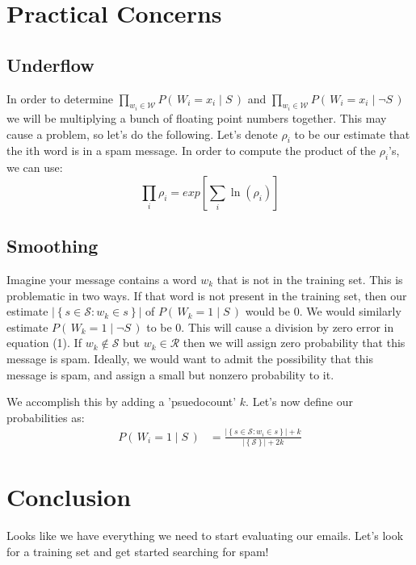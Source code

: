 \documentclass[11pt, oneside]{article}   	%
\begin{document}
\section*{Practical Concerns}
\subsection*{Underflow} In order to determine $\prod_{w_i \in \mathcal{W}} P(\,W_i=x_i \mid S\,)$ and $\prod_{w_i \in \mathcal{W}} P(\,W_i=x_i \mid \neg S\,)$ we will be multiplying a bunch of floating point numbers together. This may cause a problem, so let's do the following. Let's denote $\rho_i$ to be our estimate that the ith word is in a spam message. In order to compute the product of the $\rho_i$'s, we can use:
\begin{equation}
\prod_i \rho_i = exp \left[ \sum_i \ln(\rho_i) \right]
\end{equation}
\subsection*{Smoothing}Imagine your message contains a word $w_k$ that is not in the training set. This is problematic in two ways. If that word is not present in the training set, then our estimate $\left\vert\left\{ s \in \mathcal{S} : w_k \in s \right\}\right\vert$ of $P(\,W_k=1 \mid S\,)$ would be 0. We would similarly estimate $P(\,W_k=1 \mid \neg S\,)$ to be 0. This will cause a division by zero error in equation (1). If $w_k \notin \mathcal{S}$ but $w_k \in \mathcal{R}$ then we will assign zero probability that this message is spam. Ideally, we would want to admit the possibility that this message is spam, and assign a small but nonzero probability to it.

We accomplish this by adding a 'psuedocount' $k$. Let's now define our probabilities as:
\begin{align}
P(\,W_i=1 \mid S\,)&=\frac{\left\vert\left\{ s \in \mathcal{S} : w_i \in s \right\}\right\vert + k}{\left\vert\left\{ \mathcal{S} \right\} \right\vert + 2k} 
\end{align}
 
\section*{Conclusion}
Looks like we have everything we need to start evaluating our emails. Let's look for a training set and get started searching for spam!
\end{document}
